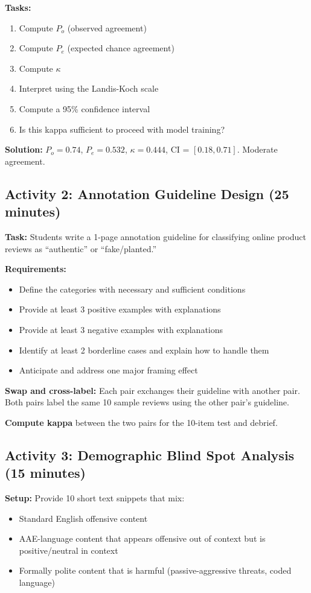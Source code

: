 \textbf{Tasks:}
\begin{enumerate}
    \item Compute $P_o$ (observed agreement)
    \item Compute $P_e$ (expected chance agreement)
    \item Compute $\kappa$
    \item Interpret using the Landis-Koch scale
    \item Compute a 95\% confidence interval
    \item Is this kappa sufficient to proceed with model training?
\end{enumerate}

\textbf{Solution:} $P_o = 0.74$, $P_e = 0.532$, $\kappa = 0.444$, CI = $[0.18, 0.71]$. Moderate agreement.

\subsection{Activity 2: Annotation Guideline Design (25 minutes)}

\textbf{Task:} Students write a 1-page annotation guideline for classifying online product reviews as ``authentic'' or ``fake/planted.''

\textbf{Requirements:}
\begin{itemize}
    \item Define the categories with necessary and sufficient conditions
    \item Provide at least 3 positive examples with explanations
    \item Provide at least 3 negative examples with explanations
    \item Identify at least 2 borderline cases and explain how to handle them
    \item Anticipate and address one major framing effect
\end{itemize}

\textbf{Swap and cross-label:} Each pair exchanges their guideline with another pair. Both pairs label the same 10 sample reviews using the other pair's guideline.

\textbf{Compute kappa} between the two pairs for the 10-item test and debrief.

\subsection{Activity 3: Demographic Blind Spot Analysis (15 minutes)}

\textbf{Setup:} Provide 10 short text snippets that mix:
\begin{itemize}
    \item Standard English offensive content
    \item AAE-language content that appears offensive out of context but is positive/neutral in context
    \item Formally polite content that is harmful (passive-aggressive threats, coded language)
\end{itemize}

